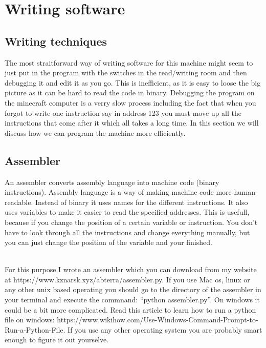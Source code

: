 \documentclass{article}
\newcommand{\assembler}{https://www.kznarsk.xyz/abterra/assembler.py}
\newcommand{\PyHow}{https://www.wikihow.com/Use-Windows-Command-Prompt-to-Run-a-Python-File}
\begin{document}

\section{Writing software}
\subsection{Writing techniques}
The most straitforward way of writing software for this machine might seem to just put in the program with the switches in the read/writing room and then debugging it and edit it as you go. This is inefficient, as it is easy to loose the big picture as it can be hard to read the code in binary. Debugging the program on the minecraft computer is a verry slow process including the fact that when you forgot to write one instruction say in address 123 you must move up all the instructions that come after it which all takes a long time. In this section we will discuss how we can program the machine more efficiently.
\subsection{Assembler\label{assembler}}
An assembler converts assembly language into machine code (binary instructions). Assembly language is a way of making machine code more human-readable. Instead of binary it uses names for the different instructions. It also uses variables to make it easier to read the specified addresses. This is usefull, because if you change the position of a certain variable or instruction. You don't have to look through all the instructions and change everything manually, but you can just change the position of the variable and your finished.

~\\
For this purpose I wrote an assembler which you can download from my website at \assembler. If you use Mac os, linux or any other unix based operating you should go to the directory of the assembler in your terminal and execute the commnand: ``python assembler.py''. On windows it could be a bit more complicated. Read this article to learn how to run a python file on windows: \PyHow. If you use any other operating system you are probably smart enough to figure it out yourselve.
\end{document}
